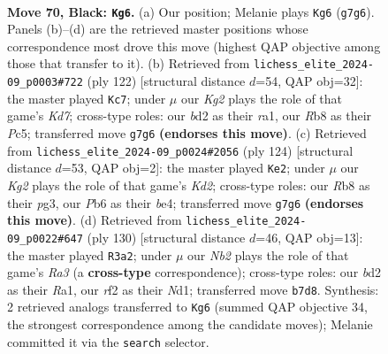 \documentclass[11pt]{article}
\begin{document}
\begin{figure}[p]\centering
\begin{subfigure}{0.46\textwidth}\centering
\resizebox{\linewidth}{!}{%
\newchessgame
\chessboard[
  setfen={1rr5/pn4k1/1p2p3/4P2R/2P5/K5P1/P1NB1R2/8 b - - 0 70},
  showmover=false,
  pgfstyle=straightmove, color=movearrow, markmove={g7-g6}
]}
\caption{}
\end{subfigure}\hfill
\begin{subfigure}{0.46\textwidth}\centering
\resizebox{\linewidth}{!}{%
\newchessgame
\chessboard[
  setfen={1r4k1/R2K2p1/6Np/2P2P1P/8/8/p7/r7 w - - 3 62},
  showmover=false,
  pgfstyle=straightmove, color=movearrow, markmove={d7-c7}
]}
\caption{}
\end{subfigure}
\\[4pt]
\begin{subfigure}{0.46\textwidth}\centering
\resizebox{\linewidth}{!}{%
\newchessgame
\chessboard[
  setfen={4r3/1ppN4/8/p1P3P1/3Rbk1P/PP4p1/3K4/8 w - - 0 63},
  showmover=false,
  pgfstyle=straightmove, color=movearrow, markmove={d2-e2}
]}
\caption{}
\end{subfigure}\hfill
\begin{subfigure}{0.46\textwidth}\centering
\resizebox{\linewidth}{!}{%
\newchessgame
\chessboard[
  setfen={r7/P7/1kp3p1/5bP1/1r5p/R7/5P1K/R2N4 w - - 10 66},
  showmover=false,
  pgfstyle=straightmove, color=movearrow, markmove={a3-a2}
]}
\caption{}
\end{subfigure}
\caption{\textbf{Move 70, Black: \texttt{Kg6}.} (a) Our position; Melanie plays \texttt{Kg6} (\texttt{g7g6}). Panels (b)--(d) are the retrieved master positions whose correspondence most drove this move (highest QAP objective among those that transfer to it). (b) Retrieved from \texttt{lichess\_elite\_2024-09\_p0003\#722} (ply 122) [structural distance $d$=54, QAP obj=32]: the master played \texttt{Kc7}; under $\mu$ our \emph{Kg2} plays the role of that game's \emph{Kd7}; cross-type roles: our \emph{b}d2 as their \emph{r}a1, our \emph{R}b8 as their \emph{P}c5; transferred move \texttt{g7g6} \textbf{(endorses this move)}. (c) Retrieved from \texttt{lichess\_elite\_2024-09\_p0024\#2056} (ply 124) [structural distance $d$=53, QAP obj=2]: the master played \texttt{Ke2}; under $\mu$ our \emph{Kg2} plays the role of that game's \emph{Kd2}; cross-type roles: our \emph{R}b8 as their \emph{p}g3, our \emph{P}b6 as their \emph{b}e4; transferred move \texttt{g7g6} \textbf{(endorses this move)}. (d) Retrieved from \texttt{lichess\_elite\_2024-09\_p0022\#647} (ply 130) [structural distance $d$=46, QAP obj=13]: the master played \texttt{R3a2}; under $\mu$ our \emph{Nb2} plays the role of that game's \emph{Ra3} (a \textbf{cross-type} correspondence); cross-type roles: our \emph{b}d2 as their \emph{R}a1, our \emph{r}f2 as their \emph{N}d1; transferred move \texttt{b7d8}. Synthesis: 2 retrieved analogs transferred to \texttt{Kg6} (summed QAP objective 34, the strongest correspondence among the candidate moves); Melanie committed it via the \texttt{search} selector.}
\label{fig:thought-m139}
\end{figure}
\end{document}
